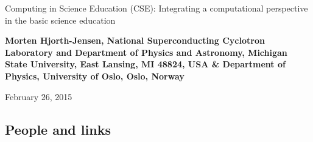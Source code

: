 \documentclass[%
twoside,                 %
final,                   %
10pt]{article}
\begin{document}






\thispagestyle{empty}

\begin{center}
{\LARGE\bf
\begin{spacing}{1.25}
Computing in Science Education (CSE): Integrating a computational perspective in the basic science education
\end{spacing}
}
\end{center}


\begin{center}
{\bf Morten Hjorth-Jensen, National Superconducting Cyclotron Laboratory and Department of Physics and Astronomy, Michigan State University, East Lansing, MI 48824, USA {\&} Department of Physics, University of Oslo, Oslo, Norway${}^{}$} \\ [0mm]
\end{center}

    \begin{center}
\end{center}
    

\begin{center} %
February 26, 2015
\end{center}

\vspace{1cm}


\subsection{People and links}

\end{document}
